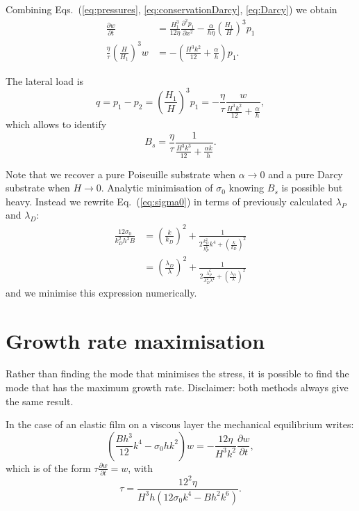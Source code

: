 \documentclass[12pt,a4paper]{revtex4}
\begin{document}
Combining Eqs.~(\ref{eq:pressures}, \ref{eq:conservationDarcy}, \ref{eq:Darcy}) we obtain
\begin{align}
\frac{\partial w}{\partial t} &= \frac{H_1^3}{12\eta} \frac{\partial^2 p_1}{\partial x^2} - \frac{\alpha}{h\eta} \left(\frac{H_1}{H}\right)^3 p_1\\
\frac{\eta}{\tau}\left(\frac{H}{H_1}\right)^3 w &= -\left(\frac{H^3 k^2}{12} + \frac{\alpha}{h}\right)p_1.
\end{align}

The lateral load is
\begin{equation}
q = p_1-p_2 = \left(\frac{H_1}{H}\right)^3 p_1 = - \frac{\eta}{\tau} \frac{w}{\frac{H^3 k^2}{12} + \frac{\alpha}{h}},
\end{equation}
which allows to identify 
\begin{equation}
B_s = \frac{\eta}{\tau}\frac{1}{\frac{H^3 k^3}{12} + \frac{\alpha k}{h}}.
\end{equation}

Note that we recover a pure Poiseuille substrate when $\alpha \rightarrow 0$ and a pure Darcy substrate when $H \rightarrow 0$. Analytic minimisation of $\sigma_0$ knowing $B_s$ is possible but heavy. Instead we rewrite Eq.~(\ref{eq:sigma0}) in terms of previously calculated $\lambda_P$ and $\lambda_D$:
\begin{align}
\frac{12\sigma_0}{k_D^2 h^2 B} &= \left(\frac{k}{k_D}\right)^2 + \frac{1}{2\frac{k_D^2}{k_P^6}k^4  + \left(\frac{k}{k_D}\right)^2}\\
&= \left(\frac{\lambda_D}{\lambda}\right)^2 + \frac{1}{2\frac{\lambda_P^6}{\lambda_D^2\lambda^4}  + \left(\frac{\lambda_D}{\lambda}\right)^2}
\end{align}
and we minimise this expression numerically.

\section{Growth rate maximisation}

Rather than finding the mode that minimises the stress, it is possible to find the mode that has the maximum growth rate. Disclaimer: both methods always give the same result.

In the case of an elastic film on a viscous layer the mechanical equilibrium writes:
\begin{equation}
\left(\frac{B h^3}{12}k^4 - \sigma_0 h k^2\right) w = -\frac{12\eta}{H^3 k^2}\frac{\partial w}{\partial t},
\end{equation}
which is of the form $\tau \frac{\partial w}{\partial t}=w$, with
\begin{equation}
\tau = \frac{12^2\eta}{H^3 h (12 \sigma_0 k^4 - B h^2 k^6)}.
\end{equation}
\end{document}
